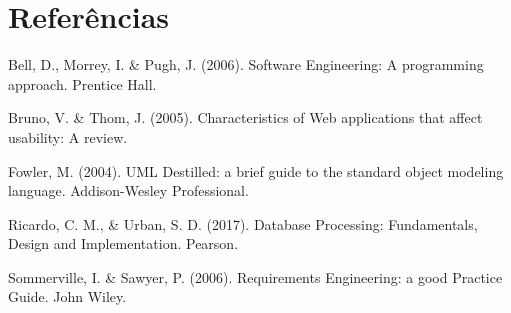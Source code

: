\documentclass[a4paper,12pt]{report}
\begin{document}
\titleformat{\chapter}[display]
{\normalfont\bfseries}{}{0pt}{\Huge}
\chapter{Referências}

Bell, D., Morrey, I. \& Pugh, J. (2006). Software Engineering: A programming approach. Prentice Hall.

Bruno, V. \& Thom, J. (2005). Characteristics of Web applications that affect usability: A review. 

Fowler, M. (2004). UML Destilled: a brief guide to the standard object modeling language. Addison-Wesley Professional.

Ricardo, C. M., \& Urban, S. D. (2017). Database Processing: Fundamentals, Design and Implementation. Pearson.

Sommerville, I. \& Sawyer, P. (2006). Requirements Engineering: a good Practice Guide. John Wiley.


	
\end{document}
